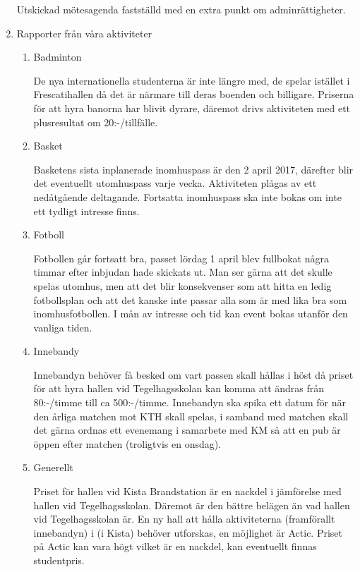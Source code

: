 \documentclass[12pt,a4paper]{article}
\begin{document}
\begin{enumerate}
			Utskickad mötesagenda fastställd med en extra punkt om adminrättigheter.
		
		\item Rapporter från våra aktiviteter
		
		    \begin{enumerate}
				\item Badminton
				    
				    De nya internationella studenterna är inte längre med, de spelar istället i Frescatihallen då det är närmare till deras boenden och billigare. Priserna för att hyra banorna har blivit dyrare, däremot drivs aktiviteten med ett plusresultat om 20:-/tillfälle.
				    
				\item Basket
				    
				    Basketens sista inplanerade inomhuspass är den 2 april 2017, därefter blir det eventuellt utomhuspass varje vecka. Aktiviteten plågas av ett nedåtgående deltagande. Fortsatta inomhuspass ska inte bokas om inte ett tydligt intresse finns.
				    
				\item Fotboll
				    
				    Fotbollen går fortsatt bra, passet lördag 1 april blev fullbokat några timmar efter inbjudan hade skickats ut. Man ser gärna att det skulle spelas utomhus, men att det blir konsekvenser som att hitta en ledig fotbollsplan och att det kanske inte passar alla som är med lika bra som inomhusfotbollen. I mån av intresse och tid kan event bokas utanför den vanliga tiden.
				    
				\item Innebandy
				    
				    Innebandyn behöver få besked om vart passen skall hållas i höst då priset för att hyra hallen vid Tegelhagsskolan kan komma att ändras från 80:-/timme till ca 500:-/timme. Innebandyn ska spika ett datum för när den årliga matchen mot KTH skall spelas, i samband med matchen skall det gärna ordnas ett evenemang i samarbete med KM så att en pub är öppen efter matchen (troligtvis en onsdag).
				    
				\item Generellt
				    
				    Priset för hallen vid Kista Brandstation är en nackdel i jämförelse med hallen vid Tegelhagsskolan. Däremot är den bättre belägen än vad hallen vid Tegelhagsskolan är. En ny hall att hålla aktiviteterna (framförallt innebandyn) i (i Kista) behöver utforskas, en möjlighet är Actic. Priset på Actic kan vara högt vilket är en nackdel, kan eventuellt finnas studentpris. 
				    

\end{enumerate}
\end{enumerate}
\end{document}

